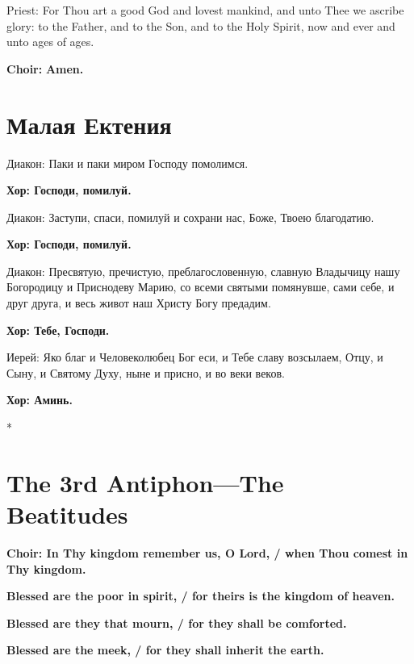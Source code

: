 \documentclass[12pt,a4paper,titlepage]{report}
\begin{document}
\begin{paracol}[1]{2}
	Priest: For Thou art a good God and lovest mankind, and unto Thee we ascribe glory: to the Father, and to the Son, and to the Holy Spirit, now and ever and unto ages of ages.
	
	\textbf{Choir:} \textbf{Amen.}
	
	\switchcolumn[1]
	
	\section*{Малая Ектения}
	
	Диакон: Паки и паки миром Господу помолимся.
	
	\textbf{Хор: Господи, помилуй.}
	
	Диакон: Заступи, спаси, помилуй и сохрани нас, Боже, Твоею благодатию.
	
	\textbf{Хор: Господи, помилуй.}
	
	Диакон: Пресвятую, пречистую, преблагословенную, славную Владычицу нашу Богородицу и Приснодеву Марию, со всеми святыми помянувше, сами себе, и друг друга, и весь живот наш Христу Богу предадим.
	
	\textbf{Хор: Тебе, Господи.}
	
	Иерей:  Яко благ и Человеколюбец Бог еси, и Тебе славу возсылаем, Отцу, и Сыну, и Святому Духу, ныне и присно, и во веки веков.
	
	\textbf{Хор: Аминь.}
	
	\switchcolumn[0]*
	
	\section*{The 3rd Antiphon---The Beatitudes}
	
	\textbf{Choir: In Thy kingdom remember us, O Lord, / when Thou comest in Thy kingdom.}
	
	\textbf{Blessed are the poor in spirit, / for theirs is the kingdom of heaven.}
	
	\textbf{Blessed are they that mourn, / for they shall be comforted.}
	
	\textbf{Blessed are the meek, / for they shall inherit the earth.}
	

\end{paracol}
\end{document}
